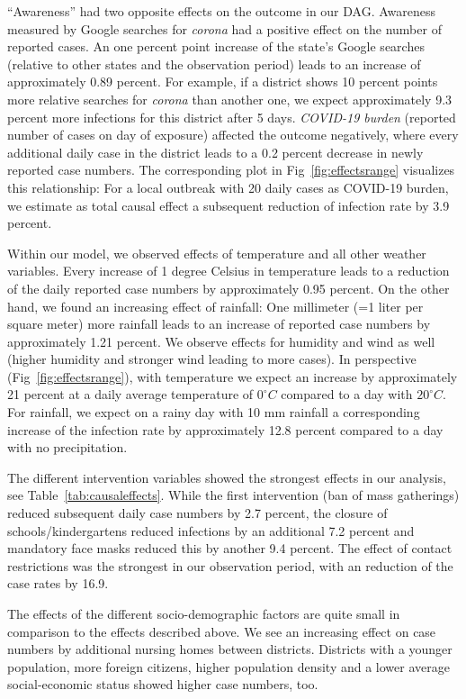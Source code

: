 \documentclass[10pt,letterpaper]{article}
\begin{document}
``Awareness'' had two opposite effects on the outcome in our DAG. Awareness measured by Google searches for \emph{corona} had a positive effect on the number of reported cases. An one percent point increase of the state's Google searches (relative to other states and the observation period) leads to an increase of approximately 0.89 percent. For example, if a district shows 10 percent points more relative searches for \emph{corona} than another one, we expect approximately 9.3 percent more infections for this district after 5 days. \emph{COVID-19 burden} (reported number of cases on day of exposure) affected the outcome negatively, where every additional daily case in the district leads to a 0.2 percent decrease in newly reported case numbers. The corresponding plot in Fig~\ref{fig:effectsrange} visualizes this relationship: For a local outbreak with 20 daily cases as COVID-19 burden, we estimate as total causal effect a subsequent reduction of infection rate by 3.9 percent.

Within our model, we observed effects of temperature and all other weather variables. Every increase of 1 degree Celsius in temperature leads to a reduction of the daily reported case numbers by approximately 0.95 percent. On the other hand, we found an increasing effect of rainfall: One millimeter (=1 liter per square meter) more rainfall leads to an increase of reported case numbers by approximately 1.21 percent. We observe effects for humidity and wind as well (higher humidity and stronger wind leading to more cases). In perspective (Fig~\ref{fig:effectsrange}), with temperature we expect an increase by approximately 21 percent at a daily average temperature of \(0^{\circ}C\) compared to a day with \(20^{\circ}C\). For rainfall, we expect on a rainy day with 10 mm rainfall a corresponding increase of the infection rate by approximately 12.8 percent compared to a day with no precipitation.

The different intervention variables showed the strongest effects in our analysis, see Table~\ref{tab:causaleffects}. While the first intervention (ban of mass gatherings) reduced subsequent daily case numbers by 2.7 percent, the closure of schools/kindergartens reduced infections by an additional 7.2 percent and mandatory face masks reduced this by another 9.4 percent. The effect of contact restrictions was the strongest in our observation period, with an reduction of the case rates by 16.9.

The effects of the different socio-demographic factors are quite small in comparison to the effects described above. We see an increasing effect on case numbers by additional nursing homes between districts. Districts with a younger population, more foreign citizens, higher population density and a lower average social-economic status showed higher case numbers, too.
\end{document}
